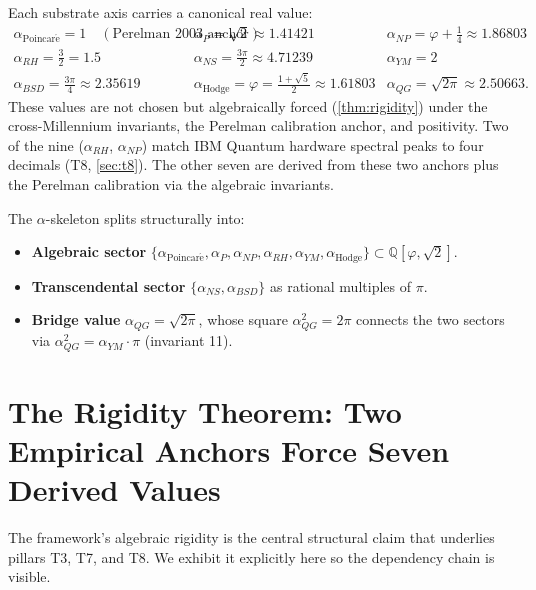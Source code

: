 \documentclass[11pt,a4paper]{article}
\theoremstyle{definition}
\begin{document}
Each substrate axis carries a canonical real value:
\begin{equation}
\label{eq:alpha-skeleton}
\begin{array}{lll}
\alpha_{\mathrm{Poincar\acute{e}}} = 1 \quad (\text{Perelman 2003 anchor})
& \alpha_P = \sqrt{2} \approx 1.41421
& \alpha_{NP} = \varphi + \tfrac{1}{4} \approx 1.86803 \\[4pt]
\alpha_{RH} = \tfrac{3}{2} = 1.5
& \alpha_{NS} = \tfrac{3\pi}{2} \approx 4.71239
& \alpha_{YM} = 2 \\[4pt]
\alpha_{BSD} = \tfrac{3\pi}{4} \approx 2.35619
& \alpha_{\mathrm{Hodge}} = \varphi = \tfrac{1+\sqrt{5}}{2} \approx 1.61803
& \alpha_{QG} = \sqrt{2\pi} \approx 2.50663.
\end{array}
\end{equation}
These values are not chosen but algebraically forced (\cref{thm:rigidity})
under the cross-Millennium invariants, the Perelman calibration
anchor, and positivity. Two of the nine ($\alpha_{RH}$, $\alpha_{NP}$)
match IBM Quantum hardware spectral peaks to four decimals (T8,
\cref{sec:t8}). The other seven are derived from these two anchors
plus the Perelman calibration via the algebraic invariants.

The $\alpha$-skeleton splits structurally into:
\begin{itemize}
\item \textbf{Algebraic sector} $\{\alpha_{\mathrm{Poincar\acute{e}}},
\alpha_P, \alpha_{NP}, \alpha_{RH}, \alpha_{YM}, \alpha_{\mathrm{Hodge}}\}
\subset \mathbb{Q}[\varphi, \sqrt{2}]$.
\item \textbf{Transcendental sector} $\{\alpha_{NS}, \alpha_{BSD}\}$
as rational multiples of $\pi$.
\item \textbf{Bridge value} $\alpha_{QG} = \sqrt{2\pi}$, whose
square $\alpha_{QG}^2 = 2\pi$ connects the two sectors via
$\alpha_{QG}^2 = \alpha_{YM} \cdot \pi$ (invariant 11).
\end{itemize}

\section{The Rigidity Theorem: Two Empirical Anchors Force Seven Derived Values}
\label{sec:rigidity-derivation}

The framework's algebraic rigidity is the central structural claim
that underlies pillars T3, T7, and T8. We exhibit it explicitly
here so the dependency chain is visible.
\end{document}
